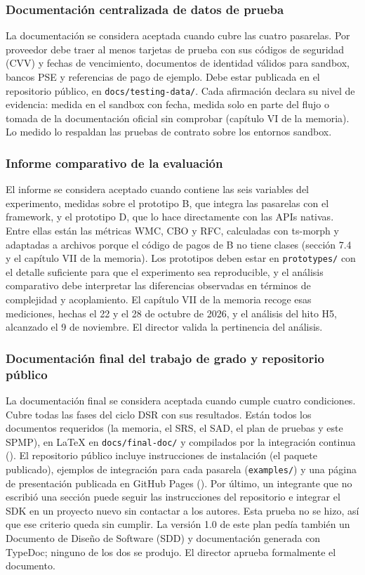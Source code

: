 \subsubsection{Documentación centralizada de datos de prueba}

La documentación se considera aceptada cuando cubre las cuatro pasarelas. Por proveedor debe traer al menos tarjetas de prueba con sus códigos de seguridad (CVV) y fechas de vencimiento, documentos de identidad válidos para sandbox, bancos PSE y referencias de pago de ejemplo. Debe estar publicada en el repositorio público, en \texttt{docs/testing-data/}. Cada afirmación declara su nivel de evidencia: medida en el sandbox con fecha, medida solo en parte del flujo o tomada de la documentación oficial sin comprobar (capítulo VI de la memoria). Lo medido lo respaldan las pruebas de contrato sobre los entornos sandbox.

\subsubsection{Informe comparativo de la evaluación}

El informe se considera aceptado cuando contiene las seis variables del experimento, medidas sobre el prototipo B, que integra las pasarelas con el framework, y el prototipo D, que lo hace directamente con las APIs nativas. Entre ellas están las métricas WMC, CBO y RFC, calculadas con ts-morph y adaptadas a archivos porque el código de pagos de B no tiene clases (sección 7.4 y el capítulo VII de la memoria). Los prototipos deben estar en \texttt{prototypes/} con el detalle suficiente para que el experimento sea reproducible, y el análisis comparativo debe interpretar las diferencias observadas en términos de complejidad y acoplamiento. El capítulo VII de la memoria recoge esas mediciones, hechas el 22 y el 28 de octubre de 2026, y el análisis del hito H5, alcanzado el 9 de noviembre. El director valida la pertinencia del análisis.

\subsubsection{Documentación final del trabajo de grado y repositorio público}

La documentación final se considera aceptada cuando cumple cuatro condiciones. Cubre todas las fases del ciclo DSR con sus resultados. Están todos los documentos requeridos (la memoria, el SRS, el SAD, el plan de pruebas y este SPMP), en LaTeX en \texttt{docs/final-doc/} y compilados por la integración continua (). El repositorio público incluye instrucciones de instalación (el paquete publicado), ejemplos de integración para cada pasarela (\texttt{examples/}) y una página de presentación publicada en GitHub Pages (). Por último, un integrante que no escribió una sección puede seguir las instrucciones del repositorio e integrar el SDK en un proyecto nuevo sin contactar a los autores. Esta prueba no se hizo, así que ese criterio queda sin cumplir. La versión 1.0 de este plan pedía también un Documento de Diseño de Software (SDD) y documentación generada con TypeDoc; ninguno de los dos se produjo. El director aprueba formalmente el documento.
